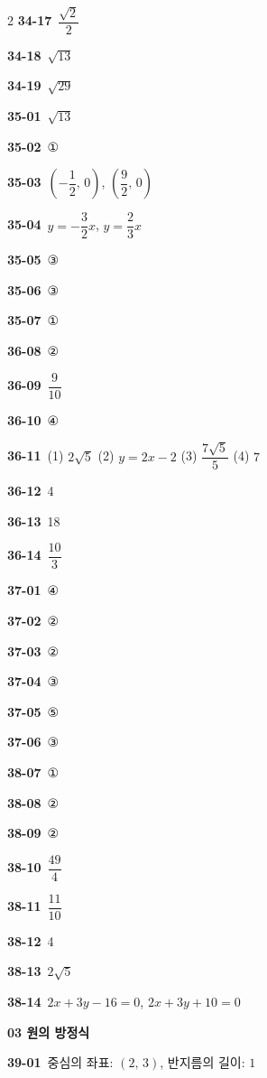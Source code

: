 \documentclass[10pt,a4paper]{article}
\begin{document}
\begin{multicols}{2}
\noindent\textbf{34-17}\ $\dfrac{\sqrt{2}}{2}$\par
\noindent\textbf{34-18}\ $\sqrt{13}$\par
\noindent\textbf{34-19}\ $\sqrt{29}$\par
\noindent\textbf{35-01}\ $\sqrt{13}$\par
\noindent\textbf{35-02}\ ①\par
\noindent\textbf{35-03}\ $\left(-\dfrac{1}{2},\,0\right)$, $\left(\dfrac{9}{2},\,0\right)$\par
\noindent\textbf{35-04}\ $y=-\dfrac{3}{2}x$, $y=\dfrac{2}{3}x$\par
\noindent\textbf{35-05}\ ③\par
\noindent\textbf{35-06}\ ③\par
\noindent\textbf{35-07}\ ①\par
\noindent\textbf{36-08}\ ②\par
\noindent\textbf{36-09}\ $\dfrac{9}{10}$\par
\noindent\textbf{36-10}\ ④\par
\noindent\textbf{36-11}\ (1) $2\sqrt{5}$ (2) $y=2x-2$ (3) $\dfrac{7\sqrt{5}}{5}$ (4) $7$\par
\noindent\textbf{36-12}\ 4\par
\noindent\textbf{36-13}\ 18\par
\noindent\textbf{36-14}\ $\dfrac{10}{3}$\par
\noindent\textbf{37-01}\ ④\par
\noindent\textbf{37-02}\ ②\par
\noindent\textbf{37-03}\ ②\par
\noindent\textbf{37-04}\ ③\par
\noindent\textbf{37-05}\ ⑤\par
\noindent\textbf{37-06}\ ③\par
\noindent\textbf{38-07}\ ①\par
\noindent\textbf{38-08}\ ②\par
\noindent\textbf{38-09}\ ②\par
\noindent\textbf{38-10}\ $\dfrac{49}{4}$\par
\noindent\textbf{38-11}\ $\dfrac{11}{10}$\par
\noindent\textbf{38-12}\ 4\par
\noindent\textbf{38-13}\ $2\sqrt{5}$\par
\noindent\textbf{38-14}\ $2x+3y-16=0$, $2x+3y+10=0$\par
\noindent\textbf{03 원의 방정식}\par\smallskip
\noindent\textbf{39-01}\ 중심의 좌표: $(2,\,3)$, 반지름의 길이: $1$\par

\end{multicols}
\end{document}
